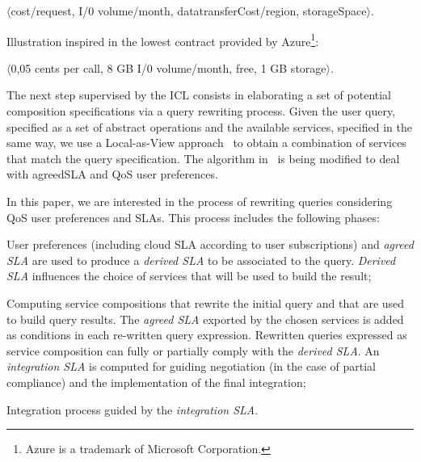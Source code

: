 \begin{trivlist}\sf\footnotesize
 \item[~-~cloudSLA:]  $\langle$cost/request, I/0 volume/month, datatransferCost/region, storageSpace$\rangle$.
 \end{trivlist}
 
Illustration inspired in the lowest contract provided by Azure\footnote{Azure is a trademark of Microsoft Corporation.}: 
 \begin{trivlist}\sf\footnotesize
\item[~-~cloudSLA:]  $\langle$0,05 cents per call, 8 GB I/0 volume/month, free, 1 GB storage$\rangle$. 
\end{trivlist}


 


The next step supervised by the ICL consists in elaborating a set of potential composition specifications via a query rewriting process. Given the user query, specified as a set of abstract operations and the available services, specified in the same way, we use a Local-as-View approach~\cite{CostaAMR13} to obtain a combination of services that match the query specification.
The algorithm in~\cite{CostaAMR13} is being modified to deal with agreedSLA and QoS user preferences.

 

In this paper, we are interested in the process of rewriting queries  considering QoS user preferences and SLAs.
This process includes the following phases: 
\begin{trivlist}
\item[~1)]  User preferences (including cloud SLA according to user subscriptions) and \textit{agreed SLA} are  used to produce a \textit{derived SLA} to be associated to the query. 
{\em Derived SLA}  influences the choice of services that will be used to build the result; 
\item[~2)] Computing service compositions that rewrite the initial query and that are used to  build query results. 
The \textit{agreed SLA} exported by the chosen services is added as conditions in  each re-written query expression. 
Rewritten queries expressed as service composition can fully or partially comply with the \textit{derived SLA}.  An \textit{integration SLA} is  computed for guiding  negotiation (in the case of partial compliance)  and the implementation of the final integration; 
\item[~3)]   Integration process guided by the \textit{integration SLA}.
\end{trivlist}
 


